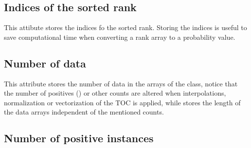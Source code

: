 \documentclass[letterpaper,10pt,english]{sphinxmanual}
\begin{document}
\subsection{Indices of the sorted rank}
\label{\detokenize{usage:indices-of-the-sorted-rank}}

\begin{fulllineitems}
\label{\detokenize{usage:ootoc.TOC.indices}}
\pysigstartsignatures
{}
\pysigstopsignatures
\sphinxAtStartPar
This attibute stores the indices fo the sorted rank. Storing the indices is useful to save computational time when converting a rank array to a probability value.

\end{fulllineitems}



\subsection{Number of data}
\label{\detokenize{usage:number-of-data}}

\begin{fulllineitems}
\label{\detokenize{usage:ootoc.TOC.ndata}}
\pysigstartsignatures
{}
\pysigstopsignatures
\sphinxAtStartPar
This attribute stores the number of data in the arrays of the class,  notice that the number of positives () or other counts are altered when interpolations, normalization or vectorization of the TOC is applied, while  stores the length of the data arrays independent of the mentioned counts.

\end{fulllineitems}



\subsection{Number of positive instances}
\label{\detokenize{usage:number-of-positive-instances}}
\end{document}
